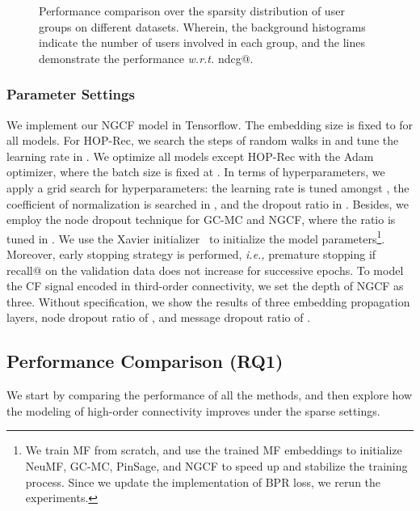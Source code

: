 \documentclass[sigconf]{acmart}
\newcommand{\ie}{\emph{i.e., }}
\newcommand{\wrt}{\emph{w.r.t. }}
\theoremstyle{definition}
\begin{document}
\begin{figure*}[t]
\centering
{}
\vspace{-15pt}
\caption{Performance comparison over the sparsity distribution of user groups on different datasets.
Wherein, the background histograms indicate the number of users involved in each group, and the lines demonstrate the performance \wrt ndcg@.}
\label{fig:sparsity}\vspace{-10pt}
\end{figure*}

\subsubsection{\textbf{Parameter Settings}}
We implement our NGCF model in Tensorflow.
The embedding size is fixed to  for all models.
For HOP-Rec, we search the steps of random walks in  and tune the learning rate in .
We optimize all models except HOP-Rec with the Adam optimizer, where the batch size is fixed at .
In terms of hyperparameters, we apply a grid search for hyperparameters: the learning rate is tuned amongst , the coefficient of  normalization is searched in , and the dropout ratio in .
Besides, we employ the node dropout technique for GC-MC and NGCF, where the ratio is tuned in .
We use the Xavier initializer~\cite{Xarvier} to initialize the model parameters\footnote{We train MF from scratch, and use the trained MF embeddings to initialize NeuMF, GC-MC, PinSage, and NGCF to speed up and stabilize the training process. Since we update the implementation of BPR loss, we rerun the experiments.}.
Moreover, early stopping strategy is performed, \ie premature stopping if recall@ on the validation data does not increase for  successive epochs.
To model the CF signal encoded in third-order connectivity, we set the depth of NGCF  as three.
Without specification, we show the results of three embedding propagation layers, node dropout ratio of , and message dropout ratio of .



\subsection{Performance Comparison (RQ1)}
We start by comparing the performance of all the methods, and then explore how the modeling of high-order connectivity improves under the sparse settings.
\end{document}
